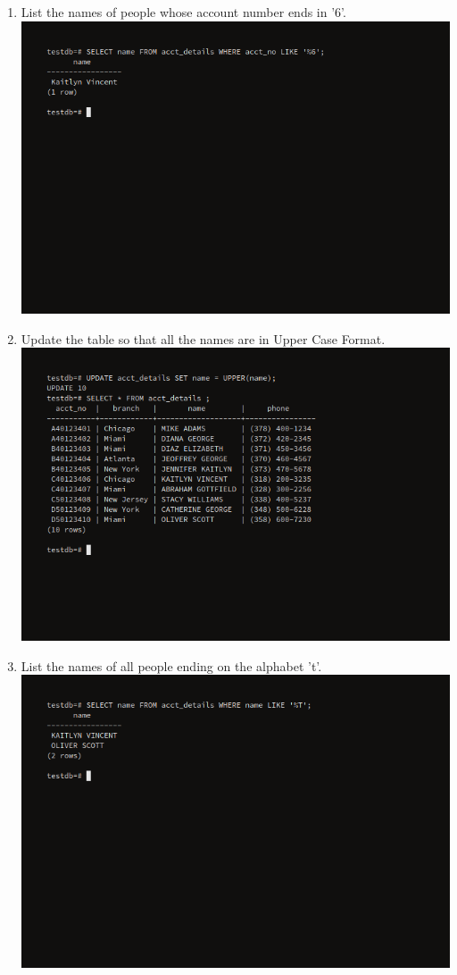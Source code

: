\documentclass[10pt,a4paper,titlepage]{report}
\begin{document}
{\begin{enumerate}
	\item List the names of people whose account number ends in '6'.\newline
	\includegraphics[width=\linewidth]{../Images/Strings/7.png}
	\item Update the table so that all the names are in Upper Case Format.\newline
	\includegraphics[width=\linewidth]{../Images/Strings/8.png}
	\item List the names of all people ending on the alphabet 't'.\newline
	\includegraphics[width=\linewidth]{../Images/Strings/9.png}

\end{enumerate}}
\end{document}
